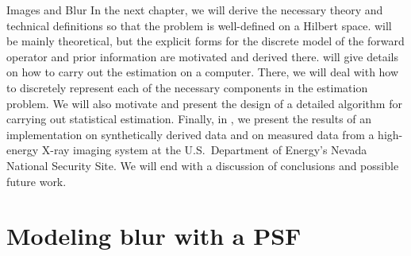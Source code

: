 \begin{chapter}{Images and Blur}
  In the next chapter, we will derive the necessary theory and technical definitions so that the problem is well-defined on a Hilbert space.
   will be mainly theoretical, but the explicit forms for the discrete model of the forward operator and prior information are motivated and derived there.
   will give details on how to carry out the estimation on a computer.
  There, we will deal with how to discretely represent each of the necessary components in the estimation problem.
  We will also motivate and present the design of a detailed algorithm for carrying out statistical estimation.
  Finally, in , we present the results of an implementation on synthetically derived data and on measured data from a high-energy X-ray imaging system at the U.S.~Department of Energy's Nevada National Security Site.
  We will end with a discussion of conclusions and possible future work.


\section{Modeling blur with a PSF}
  

\end{chapter}
